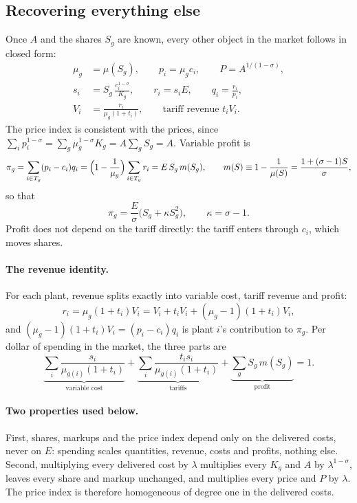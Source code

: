 \documentclass[11pt]{article}
\theoremstyle{remark}
\begin{document}
\subsection{Recovering everything else}

Once $A$ and the shares $S_g$ are known, every other object in the market follows in
closed form:
\begin{align}
  \mu_g&=\mu(S_g),\qquad p_i=\mu_gc_i,\qquad P=A^{1/(1-\sigma)},
  \label{eq:recover1}\\
  s_i&=S_g\,\frac{c_i^{1-\sigma}}{K_g},\qquad r_i=s_iE,\qquad q_i=\frac{r_i}{p_i},
  \label{eq:recover2}\\
  V_i&=\frac{r_i}{\mu_g(1+t_i)},\qquad \text{tariff revenue } t_iV_i .
  \label{eq:recover3}
\end{align}
The price index is consistent with the prices, since
$\sum_ip_i^{1-\sigma}=\sum_g\mu_g^{1-\sigma}K_g=A\sum_gS_g=A$. Variable profit is
\[
  \pi_g=\sum_{i\in T_g}(p_i-c_i)q_i=\Bigl(1-\frac{1}{\mu_g}\Bigr)\sum_{i\in T_g}r_i
  =E\,S_g\,m(S_g),
  \qquad
  m(S)\equiv1-\frac{1}{\mu(S)}=\frac{1+(\sigma-1)S}{\sigma},
\]
so that
\begin{equation}
  \pi_g=\frac{E}{\sigma}\bigl(S_g+\kappa S_g^2\bigr),\qquad\kappa=\sigma-1 .
  \label{eq:profit}
\end{equation}
Profit does not depend on the tariff directly: the tariff enters through $c_i$, which
moves shares.

\paragraph{The revenue identity.} For each plant, revenue splits exactly into
variable cost, tariff revenue and profit:
\begin{equation}
  r_i=\mu_g(1+t_i)V_i=V_i+t_iV_i+(\mu_g-1)(1+t_i)V_i,
  \label{eq:revid}
\end{equation}
and $(\mu_g-1)(1+t_i)V_i=(p_i-c_i)q_i$ is plant $i$'s contribution to $\pi_g$. Per
dollar of spending in the market, the three parts are
\begin{equation}
  \underbrace{\sum_i\frac{s_i}{\mu_{g(i)}(1+t_i)}}_{\text{variable cost}}
  +\underbrace{\sum_i\frac{t_is_i}{\mu_{g(i)}(1+t_i)}}_{\text{tariffs}}
  +\underbrace{\sum_gS_g\,m(S_g)}_{\text{profit}}=1 .
  \label{eq:perdollar}
\end{equation}

\paragraph{Two properties used below.} First, shares, markups and the price index
depend only on the delivered costs, never on $E$: spending scales quantities, revenue,
costs and profits, nothing else. Second, multiplying every delivered cost by $\lambda$
multiplies every $K_g$ and $A$ by $\lambda^{1-\sigma}$, leaves every share and markup
unchanged, and multiplies every price and $P$ by $\lambda$. The price index is
therefore homogeneous of degree one in the delivered costs.
\end{document}
